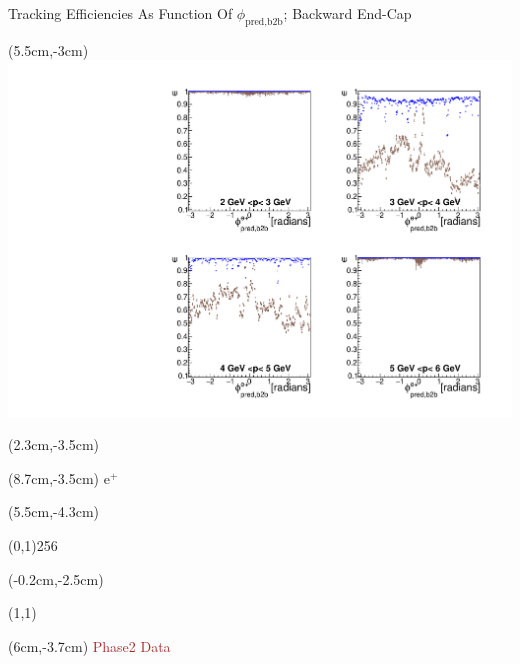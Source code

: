 \documentclass[8pt]{beamer}
\begin{document}
\begin{frame}{Tracking Efficiencies As Function Of $\phi_{\textrm{pred,b2b}}$; Backward End-Cap}
	
	
	\begin{textblock*}{6.5cm}(5.5cm,-3cm)
		\includegraphics[width=\textwidth]{VPlots/Comp/cMPhiepEC_Data}
	\end{textblock*}
	
	\begin{textblock*}{2cm}(2.3cm,-3.5cm)
	\end{textblock*}
	
	\begin{textblock*}{2cm}(8.7cm,-3.5cm)
		$\textrm{e}^+$
	\end{textblock*}
	
	
	\begin{textblock*}{11cm}(5.5cm,-4.3cm)
		
		\begin{center}
			\line(0,1){256}
		\end{center}
		
	\end{textblock*}
	
	
	\begin{textblock*}{6.5cm}(-0.2cm,-2.5cm)
		
		\setlength{\unitlength}{5cm}
		\begin{picture}(1,1)
		
		\end{picture}
		
	\end{textblock*}
	
	\begin{textblock*}{4cm}(6cm,-3.7cm)
		\textcolor{brown}{Phase2 Data}
		

\end{textblock*}
\end{frame}
\end{document}
